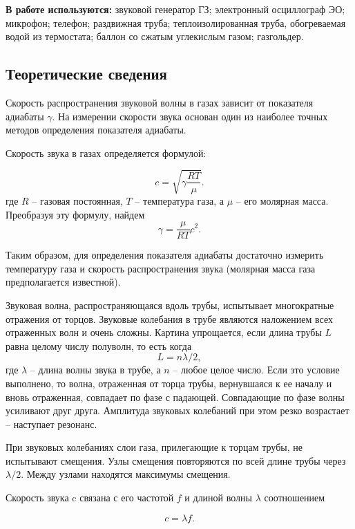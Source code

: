 \documentclass[12pt,a4paper]{article}
\begin{document}
\textbf{В работе используются:} звуковой генератор ГЗ; электронный осциллограф ЭО; микрофон; телефон; раздвижная труба; теплоизолированная труба, обогреваемая водой из термостата; баллон со сжатым углекислым газом; газгольдер.

\subsection{Теоретические сведения}

Скорость распространения звуковой волны в газах зависит от показателя адиабаты $ \gamma $. На измерении скорости звука основан один из наиболее точных методов определения показателя адиабаты.

Скорость звука в газах определяется формулой:

\begin{equation}\label{velocity}
c=\sqrt{\gamma\frac{RT}{\mu}}.
\end{equation}
где $ R $ -- газовая постоянная, $ T $ -- температура газа, а $ \mu $ -- его молярная масса. Преобразуя эту формулу, найдем
\begin{equation}\label{gamma}
\boxed{\gamma = \frac{\mu}{RT}c^2}.
\end{equation}

Таким образом, для определения показателя адиабаты достаточно измерить температуру газа и скорость распространения звука (молярная масса газа предполагается известной).

Звуковая волна, распространяющаяся вдоль трубы, испытывает многократные отражения от торцов. Звуковые колебания в трубе являются наложением всех отраженных волн и очень сложны. Картина упрощается, если длина трубы $ L $ равна целому числу полуволн, то есть когда \[ L=n\lambda/2, \] где $ \lambda $ -- длина волны звука в трубе, а $ n $ -- любое целое число. Если это условие выполнено, то волна, отраженная от торца трубы, вернувшаяся к ее началу и вновь отраженная, совпадает по фазе с падающей. Совпадающие по фазе волны усиливают друг друга. Амплитуда звуковых колебаний при этом резко возрастает -- наступает резонанс.

При звуковых колебаниях слои газа, прилегающие к торцам трубы, не испытывают смещения. Узлы смещения повторяются по всей длине трубы через $ \lambda/2 $. Между узлами находятся максимумы смещения.

Скорость звука c связана с его частотой $ f $ и длиной волны $ \lambda $ соотношением

\begin{equation}\label{lambda_f}
c=\lambda f.
\end{equation}
\end{document}
